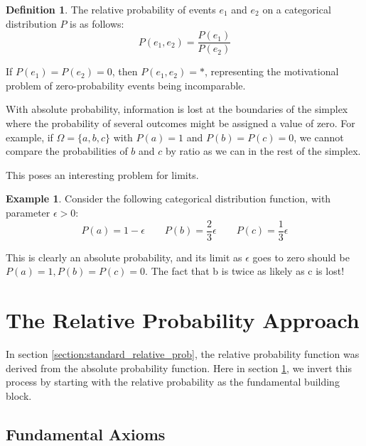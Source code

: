 \documentclass[twoside]{article}
\theoremstyle{plain}%
\theoremstyle{definition}
\newtheorem{definition}{Definition}[section]
\newtheorem{example}{Example}[section]
\theoremstyle{remark}
\begin{document}
\begin{definition}
\label{def:ratio}
The relative probability of events \(e_1\) and \(e_2\) on a categorical distribution \(P\) is as follows:
\[P(e_1, e_2) = \frac{P(e_1)}{P(e_2)}\]
\end{definition}

If \(P(e_1) = P(e_2) = 0\), then \(P(e_1, e_2) = \ast\), representing the motivational problem of zero-probability events being incomparable.

With absolute probability, information is lost at the boundaries of the simplex where the probability of several outcomes might be assigned a value of zero. For example, if \(\Omega = \{a, b, c\}\) with \(P(a) = 1\) and \(P(b) = P(c) = 0\), we cannot compare the probabilities of \(b\) and \(c\) by ratio as we can in the rest of the simplex.

This poses an interesting problem for limits.

\begin{example}
\label{ex:abs_lose_info}
Consider the following categorical distribution function, with parameter \(\epsilon > 0\):
\[
P(a) = 1 - \epsilon\qquad
P(b) = \frac{2}{3}\epsilon\qquad
P(c) = \frac{1}{3}\epsilon
\]
\end{example}

This is clearly an absolute probability, and its limit as \(\epsilon\) goes to zero should be \(P(a) = 1, P(b) = P(c) = 0\). The fact that b is twice as likely as c is lost!

\section{The Relative Probability Approach}
\label{section:new_relative_prob}

In section \ref{section:standard_relative_prob}, the relative probability function was derived from the absolute probability function. Here in section \ref{section:new_relative_prob}, we invert this process by starting with the relative probability as the fundamental building block.

\subsection{Fundamental Axioms}
\end{document}
